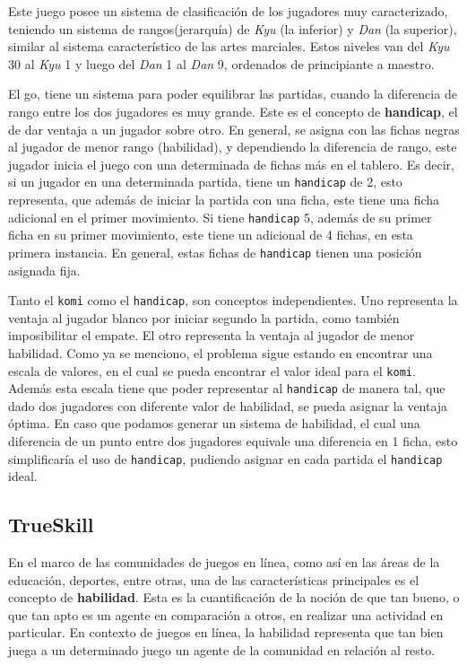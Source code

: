\documentclass[11pt,twoside, spanish]{report} %
\begin{document}
Este juego posee un sistema de clasificaci\'on de los jugadores muy caracterizado, teniendo un sistema de rangos(jerarqu\'ia) de \textit{Kyu} (la inferior) y \textit{Dan} (la superior), similar al sistema caracter\'istico de las artes marciales. Estos niveles van del \textit{Kyu} 30 al \textit{Kyu} 1 y luego del \textit{Dan} 1 al \textit{Dan} 9, ordenados de principiante a maestro.

El go, tiene un sistema para poder equilibrar las partidas, cuando la diferencia de rango entre los dos jugadores es muy grande.
Este es el concepto de \textbf{handicap}, el de dar ventaja a un jugador sobre otro.
En general, se asigna con las fichas negras al jugador de menor rango (habilidad), y dependiendo la diferencia de rango, este jugador inicia el juego con una determinada de fichas m\'as en el tablero.
Es decir, si un jugador en una determinada partida, tiene un \texttt{handicap} de 2, esto representa, que adem\'as de iniciar la partida con una ficha, este tiene una ficha adicional en el primer movimiento.
Si tiene \texttt{handicap} 5, adem\'as  de su primer ficha en su primer movimiento, este tiene un adicional de 4 fichas, en esta primera instancia.
En general, estas fichas de \texttt{handicap} tienen una posici\'on asignada fija.

Tanto el \texttt{komi} como el \texttt{handicap}, son conceptos independientes.
Uno representa la ventaja al jugador blanco por iniciar segundo la partida, como tambi\'en imposibilitar el empate.
El otro representa la ventaja al jugador de menor habilidad.
Como ya se menciono, el problema sigue estando en encontrar una escala de valores, en el cual se pueda encontrar el valor ideal para el \texttt{komi}.
Adem\'as esta escala tiene que poder representar al \texttt{handicap} de manera tal, que dado dos jugadores con diferente valor de habilidad, se pueda asignar la ventaja \'optima.
En caso que podamos generar un sistema de habilidad, el cual una diferencia de un punto entre dos jugadores equivale una diferencia en 1 ficha, esto simplificar\'ia el uso de \texttt{handicap}, pudiendo asignar en cada partida el \texttt{handicap} ideal.







\subsection{TrueSkill}
En el marco de las comunidades de juegos en l\'inea, como as\'i en las \'areas de la educaci\'on, deportes, entre otras, una de las caracter\'isticas principales es el concepto de \textbf{habilidad}.
Esta es la cuantificaci\'on de la noci\'on de que tan bueno, o que tan apto es un agente en comparaci\'on a otros, en realizar una actividad en particular.
En contexto de juegos en l\'inea, la habilidad representa que tan bien juega a un determinado juego un agente de la comunidad en relaci\'on al resto.
\end{document}
